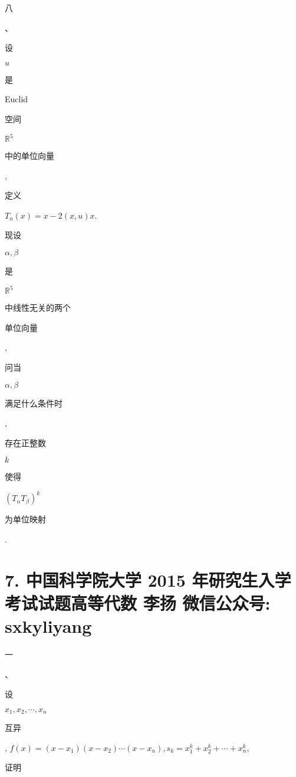 \documentclass[10pt]{article}
\begin{document}
\begin{CJK}{UTF8}{mj}八\end{CJK}、\begin{CJK}{UTF8}{mj}设\end{CJK} $u$ \begin{CJK}{UTF8}{mj}是\end{CJK} Euclid \begin{CJK}{UTF8}{mj}空间\end{CJK} $\mathbb{R}^{5}$ \begin{CJK}{UTF8}{mj}中的单位向量\end{CJK}, \begin{CJK}{UTF8}{mj}定义\end{CJK} $T_{u}(x)=x-2(x, u) x$. \begin{CJK}{UTF8}{mj}现设\end{CJK} $\alpha, \beta$ \begin{CJK}{UTF8}{mj}是\end{CJK} $\mathbb{R}^{5}$ \begin{CJK}{UTF8}{mj}中线性无关的两个\end{CJK} \begin{CJK}{UTF8}{mj}单位向量\end{CJK}, \begin{CJK}{UTF8}{mj}问当\end{CJK} $\alpha, \beta$ \begin{CJK}{UTF8}{mj}满足什么条件时\end{CJK}, \begin{CJK}{UTF8}{mj}存在正整数\end{CJK} $k$ \begin{CJK}{UTF8}{mj}使得\end{CJK} $\left(T_{\alpha} T_{\beta}\right)^{k}$ \begin{CJK}{UTF8}{mj}为单位映射\end{CJK}.

\section{7. 中国科学院大学 2015 年研究生入学考试试题高等代数 
 李扬 
 微信公众号: sxkyliyang}
\begin{CJK}{UTF8}{mj}一\end{CJK}、\begin{CJK}{UTF8}{mj}设\end{CJK} $x_{1}, x_{2}, \cdots, x_{n}$ \begin{CJK}{UTF8}{mj}互异\end{CJK}, $f(x)=\left(x-x_{1}\right)\left(x-x_{2}\right) \cdots\left(x-x_{n}\right), s_{k}=x_{1}^{k}+x_{2}^{k}+\cdots+x_{n}^{k}$, \begin{CJK}{UTF8}{mj}证明\end{CJK}
\end{document}
